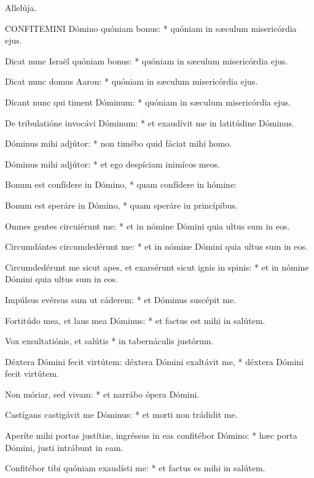  Allelúja.



\lettrine[lines=2]{C}{ONFITEMINI} Dómino quóniam bonus: * quóniam in sæculum misericórdia ejus.

Dicat nunc Israël quóniam bonus: * quóniam in sæculum misericórdia ejus.

Dicat nunc domus Aaron: * quóniam in sæculum misericórdia ejus.

Dicant nunc qui timent Dóminum: * quóniam in sæculum misericórdia ejus.

De tribulatióne invocávi Dóminum: * et exaudívit me in latitúdine Dóminus.

Dóminus mihi adjútor: * non timébo quid fáciat mihi homo.

Dóminus mihi adjútor: * et ego despíciam inimícos meos.

Bonum est confídere in Dómino, * quam confídere in hómine:

Bonum est speráre in Dómino, * quam speráre in princípibus.

Omnes gentes circuiérunt me: * et in nómine Dómini quia ultus sum in eos.

Circumdántes circumdedérunt me: * et in nómine Dómini quia ultus sum in eos.

Circumdedérunt me sicut apes, et exarsérunt sicut ignis in spinis: * et in nómine Dómini quia ultus sum in eos.

Impúlsus evérsus sum ut cáderem: * et Dóminus suscépit me.

Fortitúdo mea, et laus mea Dóminus: * et factus est mihi in salútem.

Vox exsultatiónis, et salútis * in tabernáculis justórum.

Déxtera Dómini fecit virtútem: déxtera Dómini exaltávit me, * déxtera Dómini fecit virtútem.

Non móriar, sed vivam: * et narrábo ópera Dómini.

Castígans castigávit me Dóminus: * et morti non trádidit me.

Aperíte mihi portas justítiæ, ingréssus in eas confitébor Dómino: * hæc porta Dómini, justi intrábunt in eam.

Confitébor tibi quóniam exaudísti me: * et factus es mihi in salútem.

